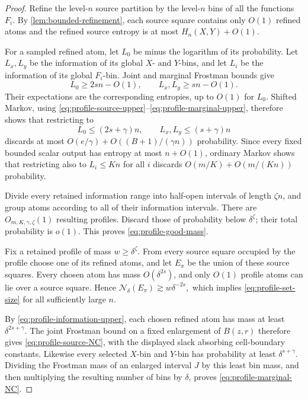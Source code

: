 \documentclass[11pt]{article}
\begin{document}
\begin{proof}
Refine the level-\(n\) source partition by the level-\(n\) bins of
all the functions \(F_i\).  By
\cref{lem:bounded-refinement}, each source square contains only
\(O(1)\) refined atoms and the refined source entropy is at most
\(H_n(X,Y)+O(1)\).

For a sampled refined atom, let \(L_0\) be minus the logarithm of
its probability.  Let \(L_x,L_y\) be the information of its global
\(X\)- and \(Y\)-bins, and let \(L_i\) be the information of its
global \(F_i\)-bin.  Joint and marginal Frostman bounds give
\begin{equation}
 L_0\ge2sn-O(1),\qquad L_x,L_y\ge sn-O(1).
 \label{eq:profile-information-lower}
\end{equation}
Their expectations are the corresponding entropies, up to \(O(1)\)
for \(L_0\).  Shifted Markov, using
\eqref{eq:profile-source-upper}--\eqref{eq:profile-marginal-upper},
therefore shows that restricting to
\begin{equation}
 L_0\le(2s+\gamma)n,\qquad
 L_x,L_y\le(s+\gamma)n
 \label{eq:profile-information-upper}
\end{equation}
discards at most
\(O(e/\gamma)+O((B+1)/(\gamma n))\) probability.  Since every
fixed bounded scalar output has entropy at most \(n+O(1)\), ordinary
Markov shows that restricting also to \(L_i\le Kn\) for all \(i\)
discards \(O(m/K)+O(m/(Kn))\) probability.

Divide every retained information range into half-open intervals of
length \(\zeta n\), and group atoms according to all of their
information intervals.  There are
\(O_{m,K,\gamma,\zeta}(1)\) resulting profiles.  Discard those of
probability below \(\delta^\zeta\); their total probability is
\(o(1)\).  This proves \eqref{eq:profile-good-mass}.

Fix a retained profile of mass \(w\ge\delta^\zeta\).  From every
source square occupied by the profile choose one of its refined
atoms, and let \(E_\pi\) be the union of these source squares.
Every chosen atom has mass \(O(\delta^{2s})\), and only \(O(1)\)
profile atoms can lie over a source square.  Hence
\(
 \mathcal N_\delta(E_\pi)\gtrsim w\delta^{-2s},
\)
which implies \eqref{eq:profile-set-size} for all sufficiently large
\(n\).

By \eqref{eq:profile-information-upper}, each chosen refined atom
has mass at least \(\delta^{2s+\gamma}\).  The joint Frostman bound
on a fixed enlargement of \(B(z,r)\) therefore gives
\eqref{eq:profile-source-NC}, with the displayed slack absorbing
cell-boundary constants.  Likewise every selected \(X\)-bin and
\(Y\)-bin has probability at least \(\delta^{s+\gamma}\).
Dividing the Frostman mass of an enlarged interval \(J\) by this
least bin mass, and then multiplying the resulting number of bins by
\(\delta\), proves \eqref{eq:profile-marginal-NC}.


\end{proof}
\end{document}

